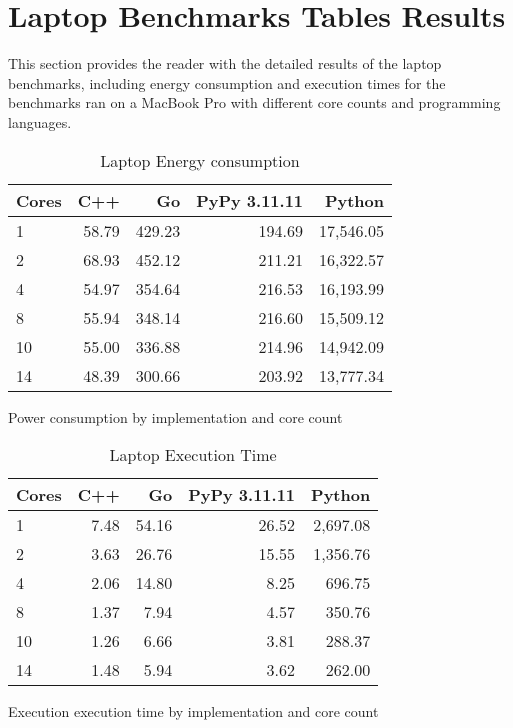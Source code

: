 \section{Laptop Benchmarks Tables Results}

This section provides the reader with the detailed results of the laptop benchmarks, including energy consumption and execution times for the benchmarks ran on a MacBook Pro with different core counts and programming languages.

\begin{table}[H]
    \centering
    \begin{tabular}{lrrrr}
        \hline
        Cores & C++   & Go       & PyPy 3.11.11 & Python      \\
        \hline
        1     & 58.79  & 429.23  & 194.69       & 17,546.05   \\
        2     & 68.93  & 452.12  & 211.21       & 16,322.57   \\
        4     & 54.97  & 354.64  & 216.53       & 16,193.99   \\
        8     & 55.94  & 348.14  & 216.60       & 15,509.12   \\
        10    & 55.00  & 336.88  & 214.96       & 14,942.09   \\
        14    & 48.39  & 300.66  & 203.92       & 13,777.34   \\
        \hline
    \end{tabular}
\caption{Laptop Energy consumption}{Power consumption by implementation and core count}
\label{tab:mbp-power-consumption}
\end{table}

\begin{table}[H]
    \centering
    \begin{tabular}{lrrrr}
        \hline
        Cores & C++  & Go    & PyPy 3.11.11 & Python    \\
        \hline
        1     & 7.48  & 54.16  & 26.52        & 2,697.08  \\
        2     & 3.63  & 26.76  & 15.55        & 1,356.76  \\
        4     & 2.06  & 14.80  & 8.25         & 696.75    \\
        8     & 1.37  & 7.94   & 4.57         & 350.76    \\
        10    & 1.26  & 6.66   & 3.81         & 288.37    \\
        14    & 1.48  & 5.94   & 3.62         & 262.00    \\
        \hline
    \end{tabular}
\caption{Laptop Execution Time}{Execution execution time by implementation and core count}
\label{tab:mbp-time-execution}
\end{table}


